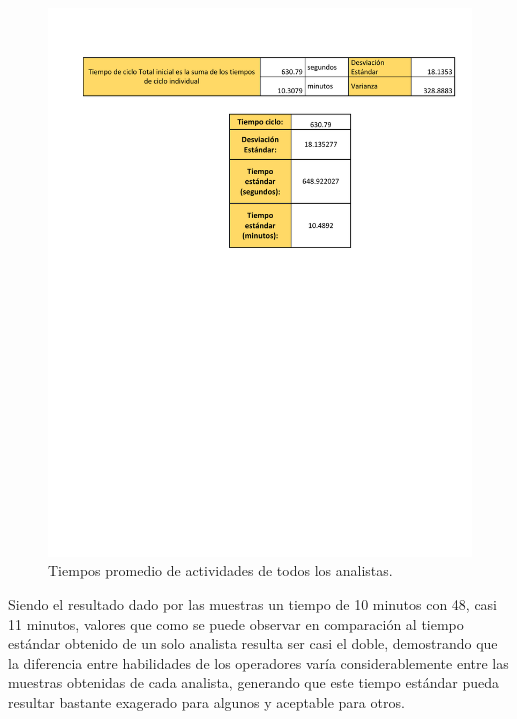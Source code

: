 \begin{figure}[H]
        \centering
        \includegraphics[trim = {10mm 150mm 1mm 20mm},clip,scale=0.4]{19/Img/resultadoMuestreo.pdf}
        \newpage
        \caption{Tiempos promedio de actividades de todos los analistas.}
        \label{fig:resultadoMuestreo}    
    \end{figure}
    Siendo el resultado dado por las muestras un tiempo de 10 minutos con 48, casi 11 minutos, valores que como se puede observar en comparación al tiempo estándar obtenido de un solo analista resulta ser casi el doble, demostrando que la diferencia entre habilidades de los operadores varía considerablemente entre las muestras obtenidas de cada analista, generando que este tiempo estándar pueda resultar bastante exagerado para algunos y aceptable para otros.
    
